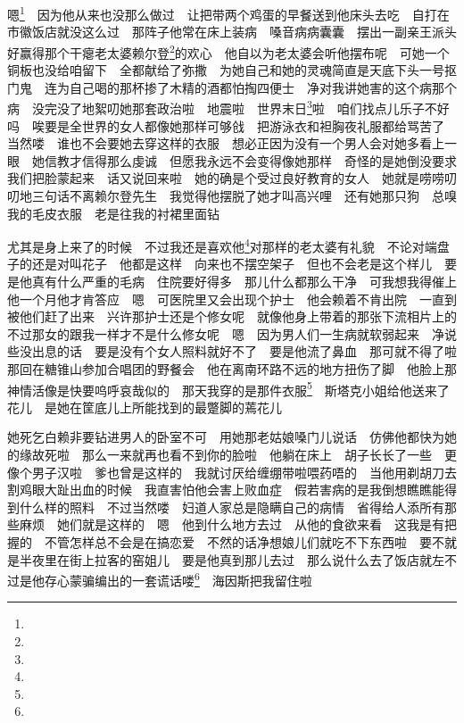 \par *嗯\footnote{}　因为他从来也没那么做过　让把带两个鸡蛋的早餐送到他床头去吃　自打在市徽饭店就没这么过　那阵子他常在床上装病　嗓音病病囊囊　摆出一副亲王派头　好赢得那个干瘪老太婆赖尔登\footnote{}的欢心　他自以为老太婆会听他摆布呢　可她一个铜板也没给咱留下　全都献给了弥撒　为她自己和她的灵魂简直是天底下头一号抠门鬼　连为自己喝的那杯掺了木精的酒都怕掏四便士　净对我讲她害的这个病那个病　没完没了地絮叨她那套政治啦　地震啦　世界末日\footnote{}啦　咱们找点儿乐子不好吗　唉要是全世界的女人都像她那样可够戗　把游泳衣和袒胸夜礼服都给骂苦了　当然喽　谁也不会要她去穿这样的衣服　想必正因为没有一个男人会对她多看上一眼　她信教才信得那么虔诚　但愿我永远不会变得像她那样　奇怪的是她倒没要求我们把脸蒙起来　话又说回来啦　她的确是个受过良好教育的女人　她就是唠唠叨叨地三句话不离赖尔登先生　我觉得他摆脱了她才叫高兴哩　还有她那只狗　总嗅我的毛皮衣服　老是往我的衬裙里面钻　
\par 尤其是身上来了的时候　不过我还是喜欢他\footnote{}对那样的老太婆有礼貌　不论对端盘子的还是对叫花子　他都是这样　向来也不摆空架子　但也不会老是这个样儿　要是他真有什么严重的毛病　住院要好得多　那儿什么都那么干净　可我想我得催上他一个月他才肯答应　嗯　可医院里又会出现个护士　他会赖着不肯出院　一直到被他们赶了出来　兴许那护士还是个修女呢　就像他身上带着的那张下流相片上的　不过那女的跟我一样才不是什么修女呢　嗯　因为男人们一生病就软弱起来　净说些没出息的话　要是没有个女人照料就好不了　要是他流了鼻血　那可就不得了啦　那回在糖锥山参加合唱团的野餐会　他在离南环路不远的地方扭伤了脚　他脸上那神情活像是快要呜呼哀哉似的　那天我穿的是那件衣服\footnote{}　斯塔克小姐给他送来了花儿　是她在筐底儿上所能找到的最蹩脚的蔫花儿　
\par 她死乞白赖非要钻进男人的卧室不可　用她那老姑娘嗓门儿说话　仿佛他都快为她的缘故死啦　那么一来就再也看不到你的脸啦　他躺在床上　胡子长长了一些　更像个男子汉啦　爹也曾是这样的　我就讨厌给缠绷带啦喂药唔的　当他用剃胡刀去割鸡眼大趾出血的时候　我直害怕他会害上败血症　假若害病的是我倒想瞧瞧能得到什么样的照料　不过当然喽　妇道人家总是隐瞒自己的病情　省得给人添所有那些麻烦　她们就是这样的　嗯　他到什么地方去过　从他的食欲来看　这我是有把握的　不管怎样总不会是在搞恋爱　不然的话净想娘儿们就吃不下东西啦　要不就是半夜里在街上拉客的窑姐儿　要是他真到那儿去过　那么说什么去了饭店就左不过是他存心蒙骗编出的一套谎话喽\footnote{}　海因斯把我留住啦　
